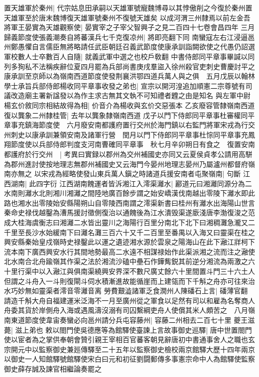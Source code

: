置天雄軍於秦州|{
	代宗姑息田承嗣以天雄軍號寵魏博尋以其悖傲削之今復於秦州置天雄軍至於唐末魏博復天雄軍號秦州不復號天雄矣}
以成河渭三州隸焉以前左金吾將軍王晏實為天雄觀察使|{
	晏實宰之子宰父智興子之見二百四十七卷會昌四年}
三月歸義節度使張義潮奏自將蕃漢兵七千克復凉州|{
	將即亮翻下同}
南蠻寇左右江浸逼邕州鄭愚懼自言儒臣無將略請任武臣朝廷召義武節度使康承訓詣闕欲使之代愚仍詔選軍校數人士卒數百人自隨|{
	就義武軍中選之也校戶敎翻}
中書侍郎同平章事畢諴以同列多狥私不法稱疾辭位夏四月罷為兵部尚書庚戌羣盜入徐州殺官吏刺史曹慶討平之　康承訓至京師以為嶺南西道節度使發荆襄洪鄂四道兵萬人與之俱　五月戊辰以翰林學士承旨兵部侍郎楊收同平章事收發之弟也|{
	宣宗以開河湟追加順憲二宗尊號有司議改造廟主署新諡發以為作主求古無其文執不可知禮者韙之由是知名}
與左軍中尉楊玄价敘同宗相結故得為相|{
	价音介為楊收與玄价交惡張本}
乙亥廢容管隸嶺南西道復以龔象二州隸桂管|{
	去年以龔象隸嶺南西道}
戊子以門下侍郎同平章事杜審權同平章事充鎮海節度使　六月廢安南都護府置行交州於海門鎮以右監門將軍宋戎為行交州刺史以康承訓兼領安南及諸軍行營　閏月以門下侍郎同平章事杜悰同平章事充鳳翔節度使以兵部侍郎判度支河南曹確同平章事　秋七月辛卯朔日有食之　復置安南都護府於行交州　|{
	考異曰實録以郡州為交州補國史亦同又云夏侯貞孝公請用高駢為郡州進討使按地理志無郡州補國史又云海門今晏州地理志晏州乃屬瀘州都督府嶺南亦無之}
以宋戎為經略使發山東兵萬人鎭之時諸道兵援安南者屯聚嶺南|{
	句斷}
江西湖南|{
	此四字衍}
江西湖南餽運者皆泝湘江入澪渠灕水|{
	酈道元曰湘灕同源分為二水南則灕水北則湘川湘灕之間陸地廣百餘步謂之始安嶠漢伐南越出零陵下灕水即此路也湘水出零陵始安縣陽朔山自零陵西南謂之澪渠新書曰桂州有灕水出海陽山世言秦命史禄伐越鑿為漕馬援討徵側復治以通餽後為江水潰毁渠遂廞淺唐李渤復浚之范成大桂海虞衡志曰湘灕二水皆出靈川之海陽行百里分南北下北下曰湘稠灘急瀧又二千里至長沙水始緩南下曰灕名灘三百六十又千二百里至番禺以入海又曰靈渠在桂之興安縣秦始皇戍嶺時史禄鑿此以運之遺迹湘水源於雲泉之陽海山在此下瀜江牂柯下流本南下廣西興安水行其間地勢最高二水遠不相謀禄始作此渠派湘之流而注之瀜使北水南合北舟踰嶺其作渠之法於湘流沙磕中壘石作鏵觜鋭其前逆分湘流為兩激之六十里行渠中以入瀜江與俱南渠繞興安界深不數尺廣丈餘六十里間置斗門三十六土人但謂之斗舟入一斗則復閘斗伺水積漸進故能循崖而上建瓴而下千斛之舟亦可往來治水巧妙無如靈渠者澪音零灕音离}
勞費艱澁諸軍乏食潤州人陳磻石上言|{
	磻薄官翻}
請造千斛大舟自福建運米泛海不一月至廣州從之軍食以足然有司以和雇為名奪商人舟委其貨於岸側舟入海或遇風濤沒溺有司囚繫綱吏舟人使償其米人頗苦之　八月嶺南東道節度使韋宙奏蠻必向邕州請分兵屯容藤州|{
	容藤二州相去二百七十里}
夔王滋薨|{
	滋上弟也}
敕以閤門使吳德應等為館驛使臺諫上言故事御史巡驛|{
	唐中世置閤門使以宦者為之掌供奉朝會贊引親王宰相百官蕃客朝見辭唐初中書通事舍人之職也玄宗開元中以監察御史兼廵傳驛至二十五年以監察御史檢校兩京館驛大歷十四年兩京以御史一人知館驛號館驛使宋白曰元和初征劉闘郵傳多事憲宗命中人為館驛使監察御史薛存誠及諫官相繼論奏罷之}
